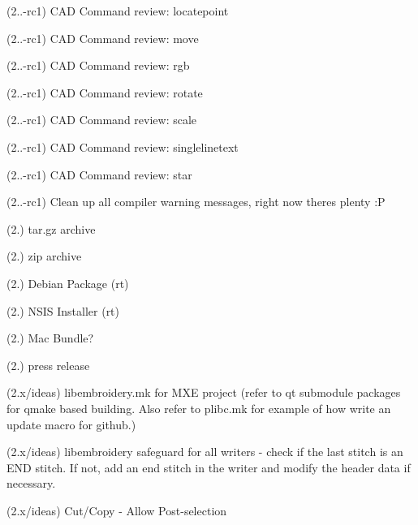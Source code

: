\begin{DoxyRefList}
\label{todo__todo000274}%
%
(2..-\/rc1) CAD Command review\+: locatepoint

\label{todo__todo000275}%
%
(2..-\/rc1) CAD Command review\+: move

\label{todo__todo000276}%
%
(2..-\/rc1) CAD Command review\+: rgb

\label{todo__todo000277}%
%
(2..-\/rc1) CAD Command review\+: rotate

\label{todo__todo000278}%
%
(2..-\/rc1) CAD Command review\+: scale

\label{todo__todo000279}%
%
(2..-\/rc1) CAD Command review\+: singlelinetext

\label{todo__todo000280}%
%
(2..-\/rc1) CAD Command review\+: star

\label{todo__todo000281}%
%
(2..-\/rc1) Clean up all compiler warning messages, right now theres plenty \+:P

\label{todo__todo000282}%
%
(2.) tar.\+gz archive

\label{todo__todo000283}%
%
(2.) zip archive

\label{todo__todo000284}%
%
(2.) Debian Package (rt)

\label{todo__todo000285}%
%
(2.) NSIS Installer (rt)

\label{todo__todo000286}%
%
(2.) Mac Bundle?

\label{todo__todo000287}%
%
(2.) press release

\label{todo__todo000288}%
%
(2.\+x/ideas) libembroidery.\+mk for MXE project (refer to qt submodule packages for qmake based building. Also refer to plibc.\+mk for example of how write an update macro for github.)

\label{todo__todo000289}%
%
(2.\+x/ideas) libembroidery safeguard for all writers -\/ check if the last stitch is an END stitch. If not, add an end stitch in the writer and modify the header data if necessary.

\label{todo__todo000290}%
%
(2.\+x/ideas) Cut/\+Copy -\/ Allow Post-\/selection


\end{DoxyRefList}
